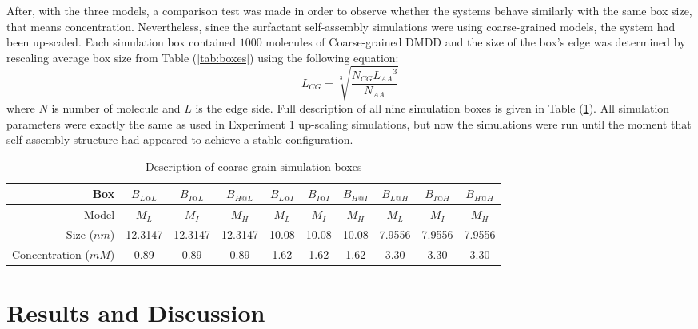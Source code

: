 \documentclass[10pt,a4paper,twoside]{article}
\begin{document}
  After, with the three models, a comparison test was made in order to observe whether the systems behave similarly with the same box size, that means concentration. Nevertheless, since the surfactant self-assembly simulations were using coarse-grained models, the system had been up-scaled. Each simulation box contained $1000$ molecules of Coarse-grained DMDD and the size of the box's edge was determined by rescaling average box size from Table (\ref{tab:boxes}) using the following equation:  
\begin{equation}
L_{CG}=\sqrt[3]{\frac{N_{CG} {L_{AA}}^3}{N_{AA}}}
\label{eqn:bsize}
\end{equation}
where $N$ is number of molecule and $L$ is the edge side. Full description of all nine simulation boxes is given in Table (\ref{tab:cgbox}). All simulation parameters were exactly the same as used in Experiment 1 up-scaling simulations, but now the simulations were run until the moment that self-assembly structure had appeared to achieve a stable configuration.
\begin{table}[ht!] 
  \centering
\begin{threeparttable}

  \caption{Description of coarse-grain simulation boxes}

\begin{tabular}{|r|c|c|c||c|c|c||c|c|c|}
\hline
Box                  & $B_{L@L}$ & $B_{I@L}$ & $B_{H@L}$ & $B_{L@I}$ & $B_{I@I}$ & $B_{H@I}$ & $B_{L@H}$ & $B_{I@H}$ & $B_{H@H}$ \\ \hline
Model                &     $M_{L}$      &   $M_{I}$       &      $M_{H}$     &     $M_{L}$      &     $M_{I}$      &       $M_{H}$    &      $M_{L}$     &   $M_{I}$        &     $M_{H}$      \\ \hline
Size ($nm$)          &     12.3147      &      12.3147      &     12.3147      &     10.08      &      10.08          &      10.08          &      7.9556     &     7.9556     &     7.9556      \\ \hline
Concentration ($mM$) &     0.89      &     0.89      &    0.89       &    1.62       &          1.62 &     1.62      &    3.30       &     3.30      &     3.30      \\ \hline
\end{tabular}
  \label{tab:cgbox}%
\end{threeparttable} 
\end{table}
 
\section{Results and Discussion}
\end{document}
